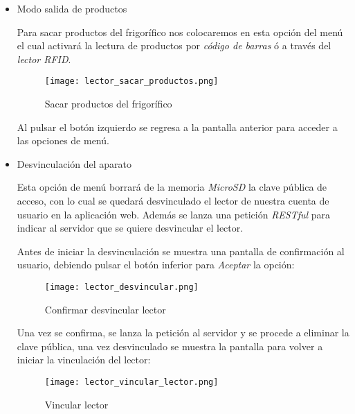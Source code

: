 \begin{itemize}
    \item Modo salida de productos

        Para sacar productos del frigorífico nos colocaremos en esta opción del menú el cual activará la lectura de productos por \emph{código de barras} ó a través del \emph{lector RFID}.

        \begin{figure}[h!]
            \centering
            \texttt{[image: lector\_sacar\_productos.png]}
            \caption{Sacar productos del frigorífico}\label{fig:lector_sacar_productos}
        \end{figure}

        Al pulsar el botón izquierdo se regresa a la pantalla anterior para acceder a las opciones de menú.

    \item Desvinculación del aparato

        Esta opción de menú borrará de la memoria \emph{MicroSD} la clave pública de acceso, con lo cual se quedará desvinculado el lector de nuestra cuenta de usuario en la aplicación web. Además se lanza una petición \emph{RESTful} para indicar al servidor que se quiere desvincular el lector.

        Antes de iniciar la desvinculación se muestra una pantalla de confirmación al usuario, debiendo pulsar el botón inferior para \emph{Aceptar} la opción:

        \begin{figure}[h!]
            \centering
            \texttt{[image: lector\_desvincular.png]}
            \caption{Confirmar desvincular lector}\label{fig:lector_desvincular}
        \end{figure}

        Una vez se confirma, se lanza la petición al servidor y se procede a eliminar la clave pública, una vez desvinculado se muestra la pantalla para volver a iniciar la vinculación del lector:

        \begin{figure}[h!]
            \centering
            \texttt{[image: lector\_vincular\_lector.png]}
            \caption{Vincular lector}\label{fig:lector_vincular_lector}
        \end{figure}

\end{itemize}